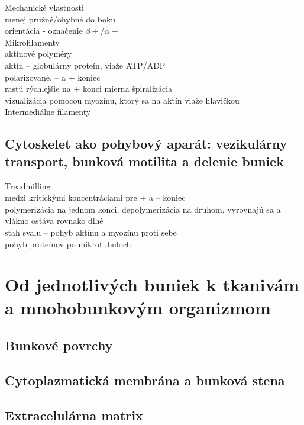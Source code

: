 Mechanické vlastnosti\\
\tab menej pružné/ohybné do boku\\
\tab orientácia - označenie $\beta+$/$\alpha-$\\

Mikrofilamenty\\
\tab aktínové polyméry\\
\tab aktín -- globulárny proteín, viaže ATP/ADP\\
\tab polarizované, -- a + koniec\\
\tab rastú rýchlejšie na + konci
\tab mierna špiralizácia\\
\tab vizualizácia pomocou myozínu, ktorý sa na aktín viaže hlavičkou\\

Intermediálne filamenty\\
\subsection{Cytoskelet ako pohybový aparát: vezikulárny transport, bunková motilita a delenie buniek}
Treadmilling\\
\tab medzi kritickými koncentráciami pre + a -- koniec\\
\tab polymerizácia na jednom konci, depolymerizácia na druhom, vyrovnajú sa a vlákno ostáva rovnako dlhé\\
sťah svalu -- pohyb aktínu a myozínu proti sebe\\
pohyb proteínov po mikrotubuloch\\

\section{Od jednotlivých buniek k tkanivám a mnohobunkovým organizmom}

\subsection{Bunkové povrchy}

\subsection{Cytoplazmatická membrána a bunková stena}

\subsection{Extracelulárna matrix}

